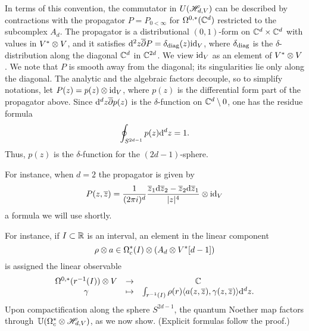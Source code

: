 In terms of this convention, the commutator in $U(\mathscr H_{d,V})$ can be described by contractions with the propagator $P = P_{0 < \infty}$ for $\Omega^{0,*}(\mathbb C^d)$ restricted to the subcomplex $A_d$. 
The propagator is a distributional $(0,1)$-form on $\mathbb C^d \times \mathbb C^d$ with values in $V^* \otimes V$, 
and it satisfies ${\rm d}^2 z \overline{\partial} P = \delta_{{\rm diag}} (z) {\rm id}_V$, where $\delta_{{\rm diag}}$ is the $\delta$-distribution along the diagonal $\mathbb C^d$ in $\mathbb C^{2d}$. 
We view ${\rm id}_V$ as an element of $V^* \otimes V$. 
We note that $P$ is smooth away from the diagonal; 
its singularities lie only along the diagonal.
The analytic and the algebraic factors decouple, 
so to simplify notations, let $P(z) = p(z) \otimes {\rm id}_V$, 
where $p(z)$ is the differential form part of the propagator above. 
Since ${\rm d}^d z \overline{\partial} p(z)$ is the $\delta$-function on $\mathbb C^d \setminus 0$,
one has the residue formula
\[
\oint_{S^{2d-1}} p(z) {\rm d}^d z = 1 .
\]
Thus, $p(z)$ is the $\delta$-function for the $(2d-1)$-sphere.

For instance, when $d=2$ the propagator is given by
\[
P (z,\overline{z}) = \frac{1}{(2\pi i)^d} \frac{\overline{z}_1 {\rm d} \overline{z}_2 - \overline{z}_2 {\rm d} \overline{z}_1}{|z|^4} \otimes {\rm id}_{V} 
\]
a formula we will use shortly.


For instance, if $I \subset \mathbb R$ is an interval, an element in the linear component $$\rho \otimes a \in \Omega^*_c(I) \otimes \left(A_d \otimes V^*[d-1]\right)$$ is assigned the linear observable 
\[
\begin{array}{cccc}
\Omega^{0,*}(r^{-1}(I)) \otimes V & \to & \mathbb C \\
\gamma & \mapsto & \int_{r^{-1}(I)} \rho(r) \langle a(z,\overline{z}), \gamma(z,\overline{z})\rangle {\rm d}^d z .
\end{array}
\] 
Upon compactification along the sphere $S^{2d-1}$, 
the quantum Noether map factors through~$\mathbb U(\Omega^*_c \otimes \mathscr H_{d,V})$,
as we now show.
(Explicit formulas follow the proof.)

